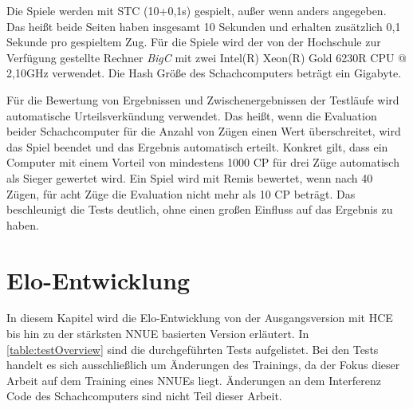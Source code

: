 Die Spiele werden mit \ac{STC} (10+0,1s) gespielt, außer wenn anders angegeben. Das heißt beide Seiten haben insgesamt 10 Sekunden und erhalten zusätzlich 0,1 Sekunde pro gespieltem Zug. Für die Spiele wird der von der Hochschule zur Verfügung gestellte Rechner \emph{BigC} mit zwei Intel(R) Xeon(R) Gold 6230R CPU @ 2,10GHz verwendet. Die Hash Größe des Schachcomputers beträgt ein Gigabyte.

Für die Bewertung von Ergebnissen und Zwischenergebnissen der Testläufe wird automatische Urteilsverkündung verwendet. Das heißt, wenn die Evaluation beider Schachcomputer für die Anzahl von Zügen einen Wert überschreitet, wird das Spiel beendet und das Ergebnis automatisch erteilt. Konkret gilt, dass ein Computer mit einem Vorteil von mindestens 1000 \ac{CP} für drei Züge automatisch als Sieger gewertet wird. Ein Spiel wird mit Remis bewertet, wenn nach 40 Zügen, für acht Züge die Evaluation nicht mehr als 10 \ac{CP} beträgt. Das beschleunigt die Tests deutlich, ohne einen großen Einfluss auf das Ergebnis zu haben.

\section{Elo-Entwicklung}

In diesem Kapitel wird die Elo-Entwicklung von der Ausgangsversion mit \ac{HCE} bis hin zu der stärksten \ac{NNUE} basierten Version erläutert. In \autoref{table:testOverview} sind die durchgeführten Tests aufgelistet. Bei den Tests handelt es sich ausschließlich um Änderungen des Trainings, da der Fokus dieser Arbeit auf dem Training eines \acp{NNUE} liegt. Änderungen an dem Interferenz Code des Schachcomputers sind nicht Teil dieser Arbeit.

